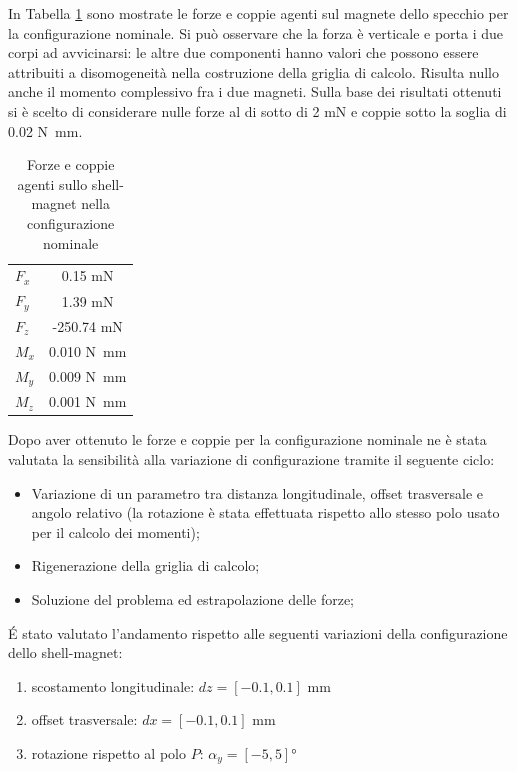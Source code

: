 In Tabella \ref{tab:M4shellbiasforces1} sono mostrate le forze e coppie agenti sul magnete dello specchio per la configurazione nominale. Si può osservare che la forza è verticale e porta i due corpi ad avvicinarsi: le altre due componenti hanno valori che possono essere attribuiti a disomogeneità nella costruzione della griglia di calcolo. Risulta nullo anche il momento complessivo fra i due magneti. Sulla base dei risultati ottenuti si è scelto di considerare nulle forze al di sotto di 2 mN e coppie sotto la soglia di 0.02 N~mm. 
 

\begin{table}
\centering
\caption{Forze e coppie agenti sullo shell-magnet nella configurazione nominale}
\label{tab:M4shellbiasforces1}
\begin{tabular}{lc}
\toprule
$F_x$ & 0.15 mN\\
$F_y$ & 1.39 mN\\
$F_z$ & -250.74 mN\\
$M_x$ & 0.010 N~mm\\
$M_y$ & 0.009 N~mm\\
$M_z$ & 0.001 N~mm\\
\bottomrule
\end{tabular}
\end{table}

Dopo aver ottenuto le forze e coppie per la configurazione nominale ne è stata valutata la sensibilità alla variazione di configurazione tramite il seguente ciclo:
\begin{itemize}
\item Variazione di un parametro tra distanza longitudinale, offset trasversale e angolo relativo (la rotazione è stata effettuata rispetto allo stesso polo usato per il calcolo dei momenti);
\item Rigenerazione della griglia di calcolo;
\item Soluzione del problema ed estrapolazione delle forze;
\end{itemize}

\'E stato valutato l'andamento rispetto alle seguenti variazioni della configurazione dello shell-magnet:
\begin{enumerate}
\item scostamento longitudinale: $dz = \left[-0.1,0.1\right]$ mm
\item offset trasversale: $dx = \left[-0.1,0.1\right]$ mm
\item rotazione rispetto al polo $P$: $\alpha_y = \left[-5,5\right]$°
\end{enumerate}

